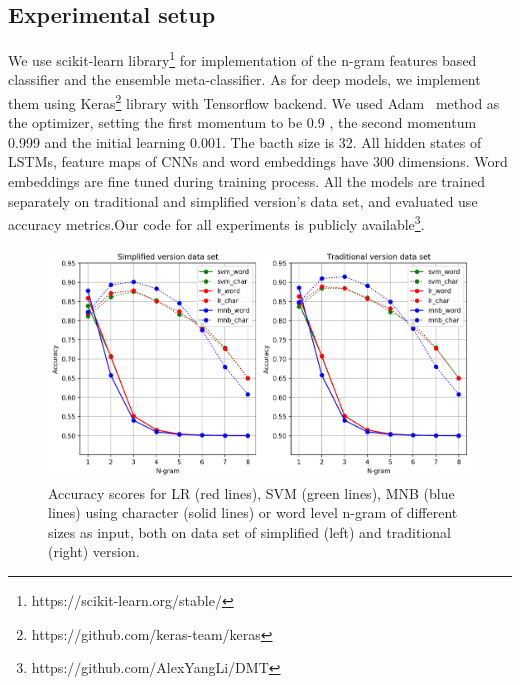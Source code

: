 \documentclass[11pt,a4paper]{article}
\begin{document}
\subsection{Experimental setup}
We use scikit-learn library\footnote{https://scikit-learn.org/stable/} for implementation of the n-gram features based classifier and the ensemble meta-classifier. As for deep models, we implement them using Keras\footnote{https://github.com/keras-team/keras} library with Tensorflow backend. We used Adam~\cite{DBLP:journals/corr/KingmaB14} method as the optimizer, setting the first momentum to be 0.9 , the second momentum 0.999 and the initial learning 0.001. The bacth size is 32. All hidden states of LSTMs, feature maps of CNNs and word embeddings have 300 dimensions. Word embeddings are fine tuned during training process. All  the models are trained separately on traditional and simplified version's data set, and evaluated use accuracy metrics.Our code for all experiments is publicly available\footnote{https://github.com/AlexYangLi/DMT}. 

\begin{figure}
\centering
\includegraphics[scale=0.6]{single_n_gram_1_2.png}
\caption{Accuracy scores for LR (red lines), SVM (green lines), MNB (blue lines) using character (solid lines) or word level n-gram of different sizes as input, both on data set of simplified (left) and traditional (right) version.}
\label{single_ngram_p}
\end{figure}
\end{document}
